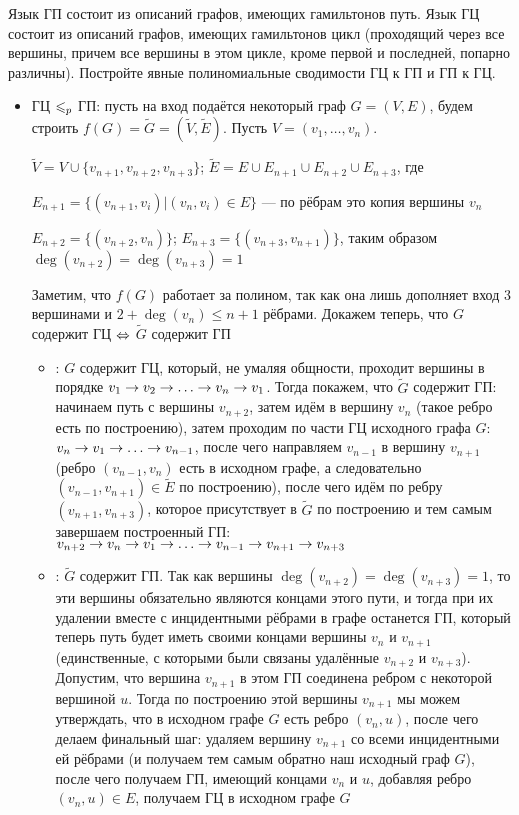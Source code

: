 \documentclass[a4paper,12pt]{article}
\begin{document}
\begin{tasknum}{6}
	Язык ГП состоит из описаний графов, имеющих гамильтонов путь. Язык ГЦ состоит из описаний графов, имеющих  гамильтонов цикл (проходящий через все вершины, причем все вершины в этом цикле, кроме первой и последней, попарно различны). Постройте явные полиномиальные сводимости ГЦ к ГП и ГП к ГЦ.
\end{tasknum}

\begin{solution}
	\begin{itemize}
		\item ГЦ $\leqslant_p$ ГП: пусть на вход подаётся некоторый граф $G = (V, E)$, будем строить $f(G) = \tilde{G} = (\tilde{V}, \tilde{E})$. Пусть $V = (v_1, \ldots, v_n)$.
		
		$\tilde{V} = V \cup \{v_{n+1}, v_{n+2}, v_{n+3}\}$; $\tilde{E} = E \cup E_{n+1} \cup E_{n+2} \cup E_{n+3}$, где 
		
		$E_{n+1} = \{(v_{n+1}, v_i) | (v_n, v_i) \in E\}$ --- по рёбрам это копия вершины $v_n$
		
		$E_{n+2} = \{(v_{n+2}, v_n)\}$; $E_{n+3} = \{(v_{n+3}, v_{n+1})\}$, таким образом $\deg (v_{n+2}) = \deg(v_{n+3}) = 1$
		
		Заметим, что $f(G)$ работает за полином, так как она лишь дополняет вход 3 вершинами и $2 + \deg(v_n) \le n+1$ рёбрами. Докажем теперь, что $G$ содержит ГЦ $\Leftrightarrow$ $\tilde{G}$ содержит ГП
		
		\begin{itemize}
			\item \Ra: $G$ содержит ГЦ, который, не умаляя общности, проходит вершины в порядке $v_1 \rightarrow v_2 \rightarrow \ldots \rightarrow v_n \rightarrow v_1$. Тогда покажем, что $\tilde{G}$ содержит ГП: начинаем путь с вершины $v_{n+2}$, затем идём в вершину $v_{n}$ (такое ребро есть по построению), затем проходим по части ГЦ исходного графа $G$: $v_n \rightarrow v_1 \rightarrow \ldots \rightarrow v_{n-1}$, после чего направляем $v_{n-1}$ в вершину $v_{n+1}$ (ребро $(v_{n-1}, v_n)$ есть в исходном графе, а следовательно $(v_{n-1}, v_{n+1}) \in \tilde{E}$ по построению), после чего идём по ребру $(v_{n+1}, v_{n+3})$, которое присутствует в $\tilde{G}$ по построению и тем самым завершаем построенный ГП: $v_{n+2} \rightarrow v_n \rightarrow v_1 \rightarrow \ldots \rightarrow v_{n-1} \rightarrow v_{n+1} \rightarrow v_{n+3}$
			
			\item \La: $\tilde{G}$ содержит ГП. Так как вершины $\deg (v_{n+2}) = \deg(v_{n+3}) = 1$, то эти вершины обязательно являются концами этого пути, и тогда при их удалении вместе с инцидентными рёбрами в графе останется ГП, который теперь путь будет иметь своими концами вершины $v_n$ и $v_{n+1}$ (единственные, с которыми были связаны удалённые $v_{n+2}$ и $v_{n+3}$). Допустим, что вершина $v_{n+1}$ в этом ГП соединена ребром с некоторой вершиной $u$. Тогда по построению этой вершины $v_{n+1}$ мы можем утверждать, что в исходном графе $G$ есть ребро $(v_n, u)$, после чего делаем финальный шаг: удаляем вершину $v_{n+1}$ со всеми инцидентными ей рёбрами (и получаем тем самым обратно наш исходный граф $G$), после чего получаем ГП, имеющий концами $v_n$ и $u$, добавляя ребро $(v_n, u) \in E$, получаем ГЦ в исходном графе $G$
		\end{itemize}
	

\end{itemize}
\end{solution}
\end{document}
